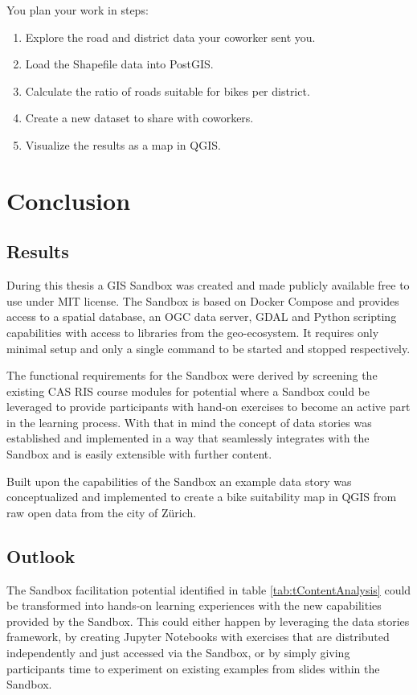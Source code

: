 \documentclass[11pt, a4paper, oneside, parskip=full-]{scrartcl}
\begin{document}
You plan your work in steps:
\begin{enumerate}
  \item Explore the road and district data your coworker sent you.
  \item Load the Shapefile data into PostGIS.
  \item Calculate the ratio of roads suitable for bikes per district.
  \item Create a new dataset to share with coworkers.
  \item Visualize the results as a map in QGIS.
\end{enumerate}

\section{Conclusion}

\subsection{Results}
During this thesis a GIS Sandbox was created and made publicly available free to
use under MIT license\cite{osgeostacksandbox}. The Sandbox is based on Docker
Compose and provides access to a spatial database, an OGC data server, GDAL and
Python scripting capabilities with access to libraries from the geo-ecosystem.
It requires only minimal setup and only a single command to be started and
stopped respectively.

The functional requirements for the Sandbox were derived by screening the
existing CAS RIS course modules for potential where a Sandbox could be leveraged
to provide participants with hand-on exercises to become an active part in the
learning process. With that in mind the concept of data stories was established
and implemented in a way that seamlessly integrates with the Sandbox and is
easily extensible with further content.

Built upon the capabilities of the Sandbox an example data story was
conceptualized and implemented to create a bike suitability map in QGIS from raw
open data from the city of Zürich.

\subsection{Outlook}
The Sandbox facilitation potential identified in table
\ref{tab:tContentAnalysis} could be transformed into hands-on learning
experiences with the new capabilities provided by the Sandbox. This could either
happen by leveraging the data stories framework, by creating Jupyter Notebooks
with exercises that are distributed independently and just accessed via the
Sandbox, or by simply giving participants time to experiment on existing
examples from slides within the Sandbox.

\newpage
\printbibliography
\end{document}
